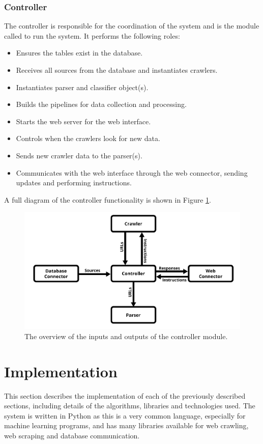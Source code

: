 \documentclass{l4proj}
\begin{document}
\subsection{Controller}
The controller is responsible for the coordination of the system and is the module called to run the system. It performs the following roles:
\begin{itemize}
    \item Ensures the tables exist in the database.
    \item Receives all sources from the database and instantiates crawlers.
    \item Instantiates parser and classifier object(s).
    \item Builds the pipelines for data collection and processing.
    \item Starts the web server for the web interface.
    \item Controls when the crawlers look for new data.
    \item Sends new crawler data to the parser(s).
    \item Communicates with the web interface through the web connector, sending updates and performing instructions.
\end{itemize}
A full diagram of the controller functionality is shown in Figure \ref{fig:controller_diagram}.
 \begin{figure}[h]
\centering
\includegraphics[width=\textwidth]{images/Controller-diagram.png}
\caption{The overview of the inputs and outputs of the controller module.}
\label{fig:controller_diagram}
\end{figure}



\chapter{Implementation}
This section describes the implementation of each of the previously described sections, including details of the algorithms, libraries and technologies used. The system is written in Python as this is a very common language, especially for machine learning programs, and has many libraries available for web crawling, web scraping and database communication.
\end{document}
